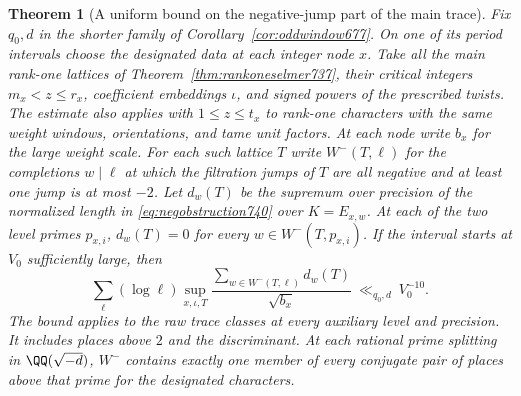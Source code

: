 \documentclass[a4paper,11pt]{article}
\newtheorem{theorem}[proposition]{Theorem}
\theoremstyle{definition}
\theoremstyle{remark}
\numberwithin{equation}{section}
\begin{document}
\begin{theorem}[A uniform bound on the negative-jump part of the main trace]
\leavevmode\label{thm:negativeinterval740}
Fix \(q_0,d\) in the shorter family of
Corollary~\ref{cor:oddwindow677}. On one of its period intervals
choose the designated data at each integer node \(x\). Take all
the main rank-one lattices of Theorem~\ref{thm:rankoneselmer737},
their critical integers \(m_x<z\le r_x\), coefficient embeddings
\(\iota\), and signed powers of the prescribed twists. The estimate
also applies with \(1\le z\le t_x\) to rank-one characters with
the same weight windows, orientations, and tame unit factors. At each node write \(b_x\) for the
large weight scale. For each such lattice \(T\) write \(W^-(T,\ell)\)
for the completions \(w\mid\ell\) at which the filtration jumps
of \(T\) are all negative and at least one jump is at most \(-2\).
Let \(d_w(T)\) be the supremum over precision of the normalized
length in \eqref{eq:negobstruction740} over \(K=E_{x,w}\).
At each of the two level primes \(p_{x,i}\),
\(d_w(T)=0\) for every \(w\in W^-(T,p_{x,i})\). If the interval
starts at \(V_0\) sufficiently large, then
\[
   \sum_{\ell}(\log\ell)
        \sup_{x,\iota,T}
        \frac{\displaystyle\sum_{w\in W^-(T,\ell)}d_w(T)}
             {\sqrt{b_x}}
       \ \ll_{q_0,d}\ V_0^{-10}.
 \tag{7}\label{eq:negativeinterval740}
\]
The bound applies to the raw trace classes at every auxiliary
level and precision. It includes places above \(2\) and the
discriminant. At each rational prime splitting in
\(\QQ(\sqrt{-d})\), \(W^-\) contains exactly one member of
every conjugate pair of places above that prime for the designated
characters.
\end{theorem}
\end{document}
